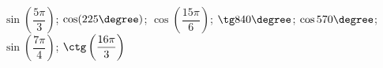 \begin{ex}[type=calculate]
	\begin{condition}
		\( \sin\left( \dfrac{5\pi}{3} \right) \); \( \cos(225\degree) \); \( \cos\left( \dfrac{15\pi}{6} \right) \); \( \tg840\degree \); \( \cos570\degree \); \( \sin\left( \dfrac{7\pi}{4} \right) \); \( \ctg\left( \dfrac{16\pi}{3} \right) \)
	\end{condition}
\end{ex}
